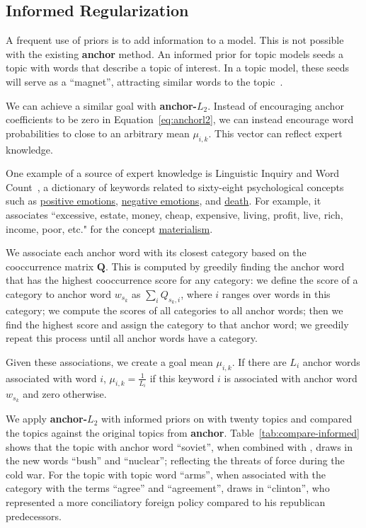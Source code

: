 \subsection{Informed Regularization}
\label{sec:informed}

A frequent use of priors is to add information to a model.  This is not possible
with the existing {\bf anchor} method.  An informed prior for topic models seeds
a topic with words that describe a topic of interest.  In a topic model, these
seeds will serve as a ``magnet'', attracting similar words to the
topic~\cite{zhai-12}.

We can achieve a similar goal with {\bf anchor-$L_2$}.  Instead of
encouraging anchor coefficients to be zero in
Equation~\ref{eq:anchorl2}, we can instead encourage word
probabilities to close to an arbitrary mean $\mu_{i,k}$.  This vector
can reflect expert knowledge.

One example of a source of expert knowledge is Linguistic Inquiry and Word
Count~\cite[]{pennebaker-99}, a dictionary of keywords related to
sixty-eight psychological concepts such as \underline{positive emotions},
\underline{negative emotions}, and \underline{death}.  For example, it
associates ``excessive, estate, money, cheap, expensive, living, profit, live,
rich, income, poor, etc." for the concept \underline{materialism}.

We associate each anchor word with its closest  category based on
the cooccurrence matrix $\bm{Q}$. This is computed by greedily finding the
anchor word that has the highest cooccurrence score for any  category:
we define the score of a category to anchor word $w_{s_k}$ as $\sum_i Q_{s_k, i}$,
where $i$ ranges over words in this category; we compute the scores of all categories to
all anchor words; then we find the highest score and assign the category to that anchor
word; we greedily repeat this process until all anchor words have a category.

Given these associations, we create a goal mean $\mu_{i,k}$.  If there
are $L_i$ anchor words associated with  word $i$, $\mu_{i, k}
= \frac{1}{L_i}$ if this keyword $i$ is associated with anchor word
$w_{s_k}$ and zero otherwise.

We apply {\bf anchor-$L_2$} with informed priors on 
with twenty topics and compared the topics against the
original topics from {\bf anchor}.  Table~\ref{tab:compare-informed}
shows that the topic with anchor word ``soviet'', when combined with
, draws in the new words
``bush'' and ``nuclear''; reflecting the threats of force during the
cold war.  For the topic with topic word ``arms'', when associated
with the  category \underline{} with the terms ``agree'' and
``agreement'', draws in ``clinton'', who represented a more
conciliatory foreign policy compared to his republican predecessors.
